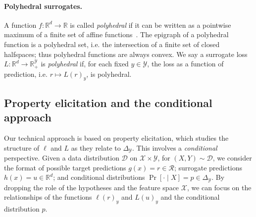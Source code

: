 \documentclass{article}
\newtheorem{theorem}{Theorem}
\theoremstyle{definition}\newtheorem{definition}{Definition}
\theoremstyle{definition}\newtheorem{assumption}{Assumption}
\newcommand{\Comments}{0}
\newcommand{\mynote}[2]{\ifnum\Comments=1\textcolor{#1}{#2}\fi}
\newcommand{\raf}[1]{\mynote{green}{[RF: #1]}}
\newcommand{\reals}{\mathbb{R}}
\newcommand{\simplex}{\Delta_\Y}
\newcommand{\D}{\mathcal{D}}
\newcommand{\R}{\mathcal{R}}
\newcommand{\X}{\mathcal{X}}
\newcommand{\Y}{\mathcal{Y}}
\begin{document}
%
%
%


\paragraph{Polyhedral surrogates.}
A function $f: \reals^d \to \reals$ is called \emph{polyhedral} if it can be written as a pointwise maximum of a finite set of affine functions~\citep[\S~19]{rockafellar1997convex}.
The epigraph of a polyhedral function is a polyhedral set, i.e. the intersection of a finite set of closed halfspaces; thus polyhedral functions are always convex.
We say a surrogate loss $L: \reals^d \to \reals_+^{\Y}$ is \emph{polyhedral} if, for each fixed $y \in \Y$, the loss as a function of prediction, i.e. $r \mapsto L(r)_y$, is polyhedral.

\subsection{Property elicitation and the conditional approach} \label{subsec:elic}
Our technical approach is based on property elicitation, which studies the structure of $\ell$ and $L$ as they relate to $\simplex$.
This involves a \emph{conditional} perspective.
Given a data distribution $\D$ on $\X \times \Y$, for $(X,Y) \sim \D$, we consider the format of possible target predictions $g(x) = r \in \R$; surrogate predictions $h(x) = u \in \reals^d$; and conditional distributions $\Pr[ \cdot \mid X] = p \in \simplex$.
By dropping the role of the hypotheses and the feature space $\X$, we can focus on the relationships of the functions $\ell(r)_y$ and $L(u)_y$ and the conditional distribution $p$.
\end{document}
